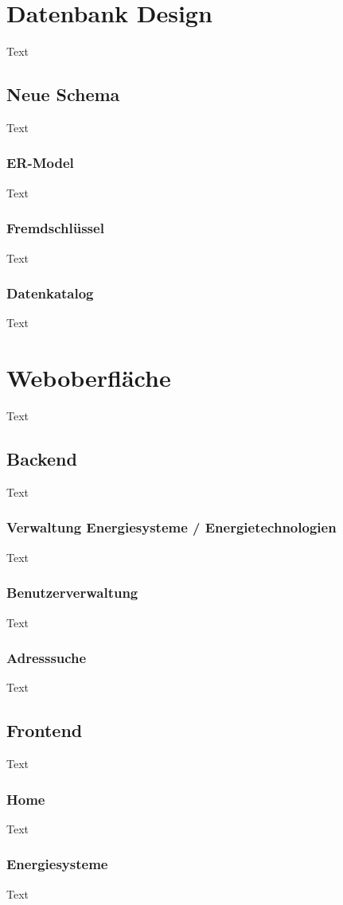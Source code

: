\section{Datenbank Design}
Text
\subsection{Neue Schema}
Text
\subsubsection{ER-Model}
Text
\subsubsection{Fremdschlüssel}
Text
\subsubsection{Datenkatalog}
Text

\section{Weboberfläche}
Text
\subsection{Backend}
Text
\subsubsection{Verwaltung Energiesysteme / Energietechnologien}
Text
\subsubsection{Benutzerverwaltung}
Text
\subsubsection{Adresssuche}
Text

\subsection{Frontend}
Text
\subsubsection{Home}
Text
\subsubsection{Energiesysteme}
Text
